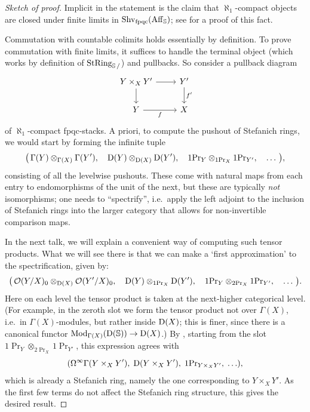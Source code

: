 \documentclass[11pt]{book}
\begin{document}
	\begin{proof}[Sketch of proof]
		Implicit in the statement is the claim that $\aleph_1$-compact objects are closed under finite limits in $\operatorname{Shv}_{\operatorname{fpqc}}(\operatorname{Aff}_{\operatorname{\mathbb S}})$; see  for a proof of this fact.

		Commutation with countable colimits holds essentially by definition. To prove commutation with finite limits, it suffices to handle the terminal object (which works by definition of ${\textup{StRing}}_{\operatorname{\mathbb S}/}$) and pullbacks. So consider a pullback diagram
		\[
			\begin{tikzcd}
				Y \times_X Y' \rar \dar & Y' \dar["{f'}"] \\
				Y \rar["f"'] & X
			\end{tikzcd}
		\]
		of $\aleph_1$-compact fpqc-stacks. A priori, to compute the pushout of Stefanich rings, we would start by forming the infinite tuple
		\[
			\big(\,\Gamma(Y) \otimes_{\Gamma(X)} \Gamma(Y'),\quad \operatorname{\mathrm{D}}(Y) \otimes_{\operatorname{\mathrm{D}}(X)} \operatorname{\mathrm{D}}(Y'),\quad 1\textup{Pr}_Y \otimes_{1\textup{Pr}_X} 1\textup{Pr}_{Y'},\quad \ldots\,\big),
		\]
		consisting of all the levelwise pushouts. These come with natural maps from each entry to endomorphisms of the unit of the next, but these are typically \emph{not} isomorphisms; one needs to ``spectrify'', i.e.\ apply the left adjoint to the inclusion of Stefanich rings into the larger category that allows for non-invertible comparison maps. 
		
		In the next talk, we will explain a convenient way of computing such tensor products. What we will see there is that we can make a `first approximation' to the spectrification, given by:
		\[
			\big(\,\mathcal{O}(Y/X)_0 \otimes_{\operatorname{\mathrm{D}}(X)} \mathcal{O}(Y'/X)_0,\quad \operatorname{\mathrm{D}}(Y) \otimes_{1\textup{Pr}_X} \operatorname{\mathrm{D}}(Y'),\quad 1\textup{Pr}_Y \otimes_{2\textup{Pr}_X} 1\textup{Pr}_{Y'},\quad \ldots\,\big).
		\]
		Here on each level the tensor product is taken at the next-higher categorical level. (For example, in the zeroth slot we form the tensor product not over $\Gamma(X)$, i.e.\ in $\Gamma(X)$-modules, but rather inside $\operatorname{\mathrm{D}}(X)$; this is finer, since there is a canonical functor ${\textup{Mod}}_{\Gamma(X)}(\operatorname{\mathrm{D}}(\operatorname{\mathbb S})) \to \operatorname{\mathrm{D}}(X)$.) By , starting from the slot $1\Pr_Y \otimes_{2\Pr_X} 1\Pr_{Y'}$, this expression agrees with
		\[
			(\Omega^\infty\Gamma(Y \times_X Y'),\; \operatorname{\mathrm{D}}(Y \times_X Y'),\; 1\textup{Pr}_{Y \times_X Y'},\; \ldots),
		\]
		which is already a Stefanich ring, namely the one corresponding to $Y \times_X Y'$. As the first few terms do not affect the Stefanich ring structure, this gives the desired result.
	\end{proof}
\end{document}
